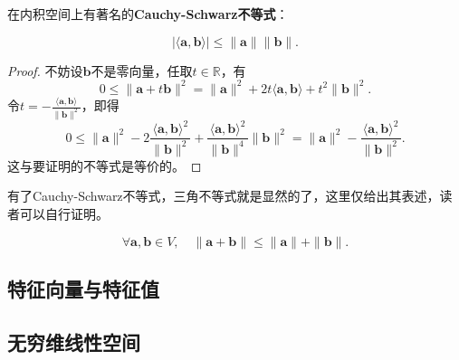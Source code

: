 在内积空间上有著名的\textbf{Cauchy-Schwarz不等式}：
\begin{theorem}
    \begin{equation}
        |\langle \mathbf{a},\mathbf{b}\rangle| \leq \|\mathbf{a}\| \|\mathbf{b}\|.
    \end{equation}
\end{theorem}
\begin{proof}
    不妨设$\mathbf{b}$不是零向量，任取$t\in \mathbb{R}$，有
    \begin{equation}
        0\leq \|\mathbf{a}+t\mathbf{b}\|^2=\|\mathbf{a}\|^2+2t\langle\mathbf{a},\mathbf{b}\rangle +t^2\|\mathbf{b}\|^2.
    \end{equation}
    令$\displaystyle t=-\frac{\langle\mathbf{a},\mathbf{b}\rangle}{\|\mathbf{b}\|^2}$，即得
    \begin{equation}
        0\leq \|\mathbf{a}\|^2-2\frac{\langle\mathbf{a},\mathbf{b}\rangle^2}{\|\mathbf{b}\|^2} +\frac{\langle\mathbf{a},\mathbf{b}\rangle^2}{\|\mathbf{b}\|^4}\|\mathbf{b}\|^2=\|\mathbf{a}\|^2-\frac{\langle\mathbf{a},\mathbf{b}\rangle^2}{\|\mathbf{b}\|^2}.
    \end{equation}
    这与要证明的不等式是等价的。
\end{proof}
有了Cauchy-Schwarz不等式，三角不等式就是显然的了，这里仅给出其表述，读者可以自行证明。
\begin{proposition}[三角不等式]
    \begin{equation}
        \forall \mathbf{a},\mathbf{b}\in V,\quad \|\mathbf{a}+\mathbf{b}\|\leq\|\mathbf{a}\|+\|\mathbf{b}\|.
    \end{equation}
\end{proposition}

\subsection{特征向量与特征值}\label{sub:eigenvector}



\subsection{无穷维线性空间}\label{sub:infinite_linear}

